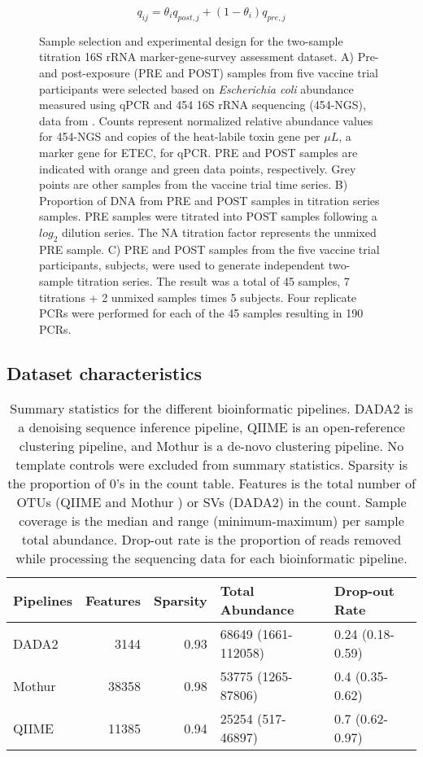 \documentclass{bmcart}
\def\texttt{[image: ]}
\begin{document}
\begin{equation}
  q_{ij} = \theta_i q_{post,j} + (1 - \theta_i) q_{pre,j}
  \label{eq:mixEq}
\end{equation}

\begin{figure}
\centering
\texttt{[image: img/experimentalDesign.png]}
\caption{\label{fig:countExperimentalDesign}Sample selection and
experimental design for the two-sample titration 16S rRNA
marker-gene-survey assessment dataset. A) Pre- and post-exposure (PRE
and POST) samples from five vaccine trial participants were selected
based on \textit{Escherichia coli} abundance measured using qPCR and 454
16S rRNA sequencing (454-NGS), data from \cite{pop2016individual}.
Counts represent normalized relative abundance values for 454-NGS and
copies of the heat-labile toxin gene per \(\mu L\), a marker gene for
ETEC, for qPCR. PRE and POST samples are indicated with orange and green
data points, respectively. Grey points are other samples from the
vaccine trial time series. B) Proportion of DNA from PRE and POST
samples in titration series samples. PRE samples were titrated into POST
samples following a \(log_2\) dilution series. The NA titration factor
represents the unmixed PRE sample. C) PRE and POST samples from the five
vaccine trial participants, subjects, were used to generate independent
two-sample titration series. The result was a total of 45 samples, 7
titrations + 2 unmixed samples times 5 subjects. Four replicate PCRs
were performed for each of the 45 samples resulting in 190 PCRs.}
\end{figure}


\subsection*{Dataset characteristics}

\begin{table}

\caption{\label{tab:pipeQA}Summary statistics for the different bioinformatic pipelines. DADA2 is a denoising sequence inference pipeline, QIIME is an open-reference clustering pipeline, and Mothur  is a de-novo clustering pipeline. No template controls were excluded from summary statistics. Sparsity is the proportion of 0's in the count table. Features is the total number of OTUs (QIIME and Mothur ) or SVs (DADA2) in the count. Sample coverage is the median and range (minimum-maximum) per sample total abundance. Drop-out rate is the proportion of reads removed while processing the sequencing data for each bioinformatic pipeline.}
\centering
\begin{tabular}[t]{lrrll}
\toprule
Pipelines & Features & Sparsity & Total Abundance & Drop-out Rate\\
\midrule
DADA2 & 3144 & 0.93 & 68649 (1661-112058) & 0.24 (0.18-0.59)\\
Mothur & 38358 & 0.98 & 53775 (1265-87806) & 0.4 (0.35-0.62)\\
QIIME & 11385 & 0.94 & 25254 (517-46897) & 0.7 (0.62-0.97)\\
\bottomrule
\end{tabular}
\end{table}
\end{document}
